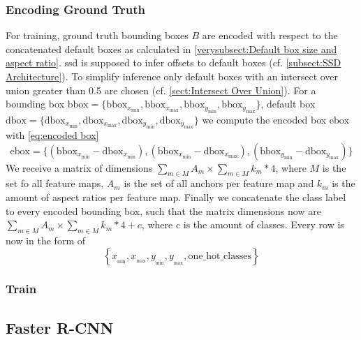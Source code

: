 \subsubsection{Encoding Ground Truth} For training, ground truth bounding boxes \(B\)
are encoded with respect to the concatenated default boxes as calculated in
\autoref{verysubsect:Default box size and aspect ratio}. \gls{ssd} is supposed
to infer offsets to default boxes (cf. \autoref{subsect:SSD Architecture}). To
simplify inference only default boxes with an intersect over union greater than
0.5 are chosen (cf. \autoref{sect:Intersect Over Union}). For a bounding box
\(\text{bbox}=\{\text{bbox}_{x_\text{min}}, \text{bbox}_{x_\text{max}}, \text{bbox}_{y_\text{min}}, \text{bbox}_{y_\text{max}}\}\), default box
\(\text{dbox}=\{\text{dbox}_{x_\text{min}}, \text{dbox}_{x_\text{max}}, \text{dbox}_{y_\text{min}}, \text{dbox}_{y_\text{max}}\}\) we compute the
encoded box \(\text{ebox}\) with \autoref{eq:encoded box}
\begin{equation}
    \text{ebox}=\{(\text{bbox}_{x_\text{min}}-\text{dbox}_{x_\text{min}}), (\text{bbox}_{x_\text{min}}-\text{dbox}_{x_\text{max}}), (\text{bbox}_{y_\text{min}}-\text{dbox}_{y_\text{max}})\}
\end{equation}\label{eq:encoded box}
We receive a matrix of dimensions \(\sum_{m\in M}{A_m}\times \sum_{m\in M}{k_m*4}\),
where \(M\) is the set fo all feature maps, \(A_m\) is the set of all anchors per
feature map and \(k_m\) is the amount of aspect ratios per feature map. Finally
we concatenate the class label to every encoded bounding box, such that the matrix
dimensions now are \(\sum_{m\in M}{A_m}\times \sum_{m\in M}{k_m*4+c}\), where c
is the amount of classes. Every row is now in the form of
\begin{equation}
    \left\{x_{_\text{min}}, x_{_\text{max}}, y_{_\text{min}}, y_{_\text{max}}, \text{one\_hot\_classes} \right\}
\end{equation}

\subsubsection{Train}
\blindtext[1]

\subsection{Faster R-CNN}
\blindtext[1]

